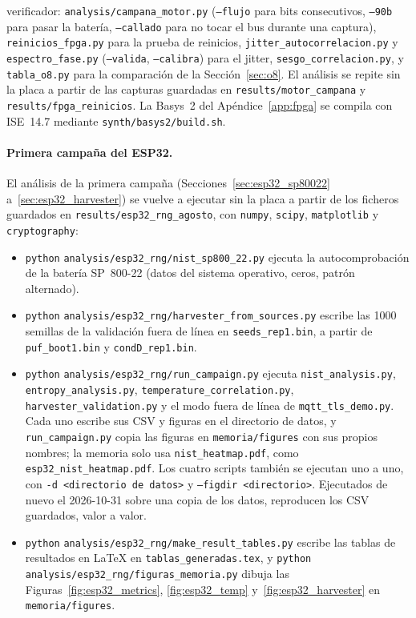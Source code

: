 \begin{itemize}
  verificador: \nolinkurl{analysis/campana_motor.py} (\texttt{--flujo}
  para bits consecutivos, \texttt{--90b} para pasar la batería,
  \texttt{--callado} para no tocar el bus durante una captura),
  \texttt{reinicios\_fpga.py} para la prueba de reinicios,
  \texttt{jitter\_autocorrelacion.py} y \texttt{espectro\_fase.py}
  (\texttt{--valida}, \texttt{--calibra}) para el jitter,
  \texttt{sesgo\_correlacion.py}, y \texttt{tabla\_o8.py} para la
  comparación de la Sección~\ref{sec:o8}. El análisis se repite sin la
  placa a partir de las capturas guardadas en
  \nolinkurl{results/motor_campana} y \nolinkurl{results/fpga_reinicios}.
  La Basys~2 del Apéndice~\ref{app:fpga} se compila con ISE~14.7 mediante
  \nolinkurl{synth/basys2/build.sh}.
\end{itemize}

\paragraph{Primera campaña del ESP32.} El análisis de la primera campaña
(Secciones~\ref{sec:esp32_sp80022} a~\ref{sec:esp32_harvester}) se vuelve a
ejecutar sin la placa a partir de los ficheros guardados en
\nolinkurl{results/esp32_rng_agosto}, con \texttt{numpy}, \texttt{scipy},
\texttt{matplotlib} y \texttt{cryptography}:
\begin{itemize}
\item \texttt{python} \nolinkurl{analysis/esp32_rng/nist_sp800_22.py}
  ejecuta la autocomprobación de la batería SP~800-22 (datos del sistema
  operativo, ceros, patrón alternado).
\item \texttt{python} \nolinkurl{analysis/esp32_rng/harvester_from_sources.py}
  escribe las 1000 semillas de la validación fuera de línea en
  \texttt{seeds\_rep1.bin}, a partir de \texttt{puf\_boot1.bin} y
  \texttt{condD\_rep1.bin}.
\item \texttt{python} \nolinkurl{analysis/esp32_rng/run_campaign.py}
  ejecuta \texttt{nist\_analysis.py}, \texttt{entropy\_analysis.py},
  \texttt{temperature\_correlation.py}, \texttt{harvester\_validation.py}
  y el modo fuera de línea de \texttt{mqtt\_tls\_demo.py}. Cada uno escribe
  sus CSV y figuras en el directorio de datos, y \texttt{run\_campaign.py}
  copia las figuras en \nolinkurl{memoria/figures} con sus propios
  nombres; la memoria solo usa \texttt{nist\_heatmap.pdf}, como
  \texttt{esp32\_nist\_heatmap.pdf}. Los cuatro scripts también se ejecutan
  uno a uno, con \texttt{-d <directorio de datos>} y
  \texttt{--figdir <directorio>}. Ejecutados de nuevo el 2026-10-31 sobre
  una copia de los datos, reproducen los CSV guardados, valor a valor.
\item \texttt{python} \nolinkurl{analysis/esp32_rng/make_result_tables.py}
  escribe las tablas de resultados en \LaTeX{} en
  \texttt{tablas\_generadas.tex}, y \texttt{python}
  \nolinkurl{analysis/esp32_rng/figuras_memoria.py} dibuja las
  Figuras~\ref{fig:esp32_metrics}, \ref{fig:esp32_temp}
  y~\ref{fig:esp32_harvester} en \nolinkurl{memoria/figures}.
\end{itemize}
